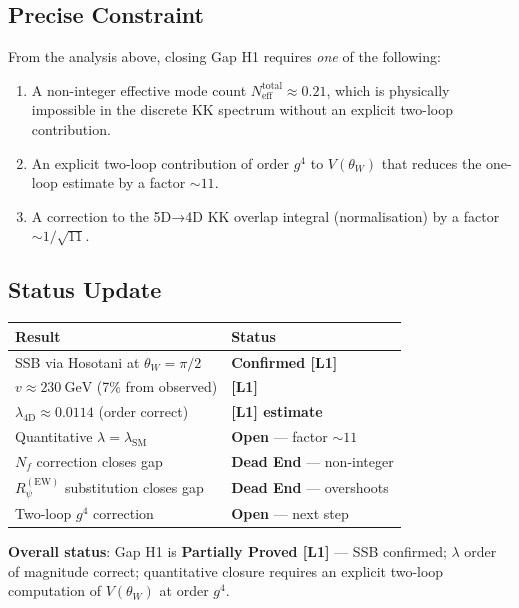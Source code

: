 \documentclass[12pt]{article}
\theoremstyle{definition}
\theoremstyle{remark}
\begin{document}
\subsection{Precise Constraint}

From the analysis above, closing Gap H1 requires \emph{one} of the following:
\begin{enumerate}
  \item A non-integer effective mode count $N_{\mathrm{eff}}^{\mathrm{total}} \approx 0.21$,
        which is physically impossible in the discrete KK spectrum without an explicit
        two-loop contribution.
  \item An explicit two-loop contribution of order $g^4$ to $V(\theta_W)$ that reduces
        the one-loop estimate by a factor $\sim 11$.
  \item A correction to the 5D→4D KK overlap integral (normalisation) by a factor
        $\sim 1/\sqrt{11}$.
\end{enumerate}

\subsection{Status Update}

\begin{center}
\begin{tabular}{|l|l|}
\hline
\textbf{Result} & \textbf{Status} \\
\hline
SSB via Hosotani at $\theta_W = \pi/2$ & \textbf{Confirmed [L1]} \\
$v \approx 230\ \text{GeV}$ (7\% from observed) & \textbf{[L1]} \\
$\lambda_{\mathrm{4D}} \approx 0.0114$ (order correct) & \textbf{[L1] estimate} \\
Quantitative $\lambda = \lambda_{\mathrm{SM}}$ & \textbf{Open} — factor $\sim 11$ \\
$N_f$ correction closes gap & \textbf{Dead End} — non-integer \\
$R_\psi^{(\mathrm{EW})}$ substitution closes gap & \textbf{Dead End} — overshoots \\
Two-loop $g^4$ correction & \textbf{Open} — next step \\
\hline
\end{tabular}
\end{center}

\textbf{Overall status}: Gap H1 is \textbf{Partially Proved [L1]} — SSB confirmed;
$\lambda$ order of magnitude correct; quantitative closure requires an explicit
two-loop computation of $V(\theta_W)$ at order $g^4$.
\end{document}
